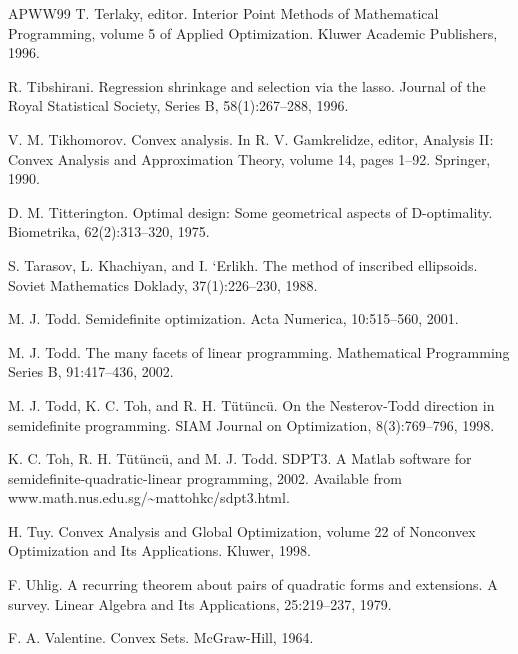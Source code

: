 \begin{thebibliography}{APWW99}
 T. Terlaky, editor. Interior Point Methods of Mathematical Programming, volume 5 of Applied Optimization. Kluwer Academic Publishers, 1996.

 R. Tibshirani. Regression shrinkage and selection via the lasso. Journal of the Royal Statistical Society, Series B, 58(1):267–288, 1996.

 V. M. Tikhomorov. Convex analysis. In R. V. Gamkrelidze, editor, Analysis II: Convex Analysis and Approximation Theory, volume 14, pages 1–92. Springer, 1990.

 D. M. Titterington. Optimal design: Some geometrical aspects of D-optimality. Biometrika, 62(2):313–320, 1975.

 S. Tarasov, L. Khachiyan, and I. `Erlikh. The method of inscribed ellipsoids. Soviet Mathematics Doklady, 37(1):226–230, 1988.

 M. J. Todd. Semidefinite optimization. Acta Numerica, 10:515–560, 2001.

 M. J. Todd. The many facets of linear programming. Mathematical Programming Series B, 91:417–436, 2002.

 M. J. Todd, K. C. Toh, and R. H. Tütüncü. On the Nesterov-Todd direction in semidefinite programming. SIAM Journal on Optimization, 8(3):769–796, 1998.

 K. C. Toh, R. H. Tütüncü, and M. J. Todd. SDPT3. A Matlab software for semidefinite-quadratic-linear programming, 2002. Available from www.math.nus.edu.sg/\textasciitilde{}mattohkc/sdpt3.html.

 H. Tuy. Convex Analysis and Global Optimization, volume 22 of Nonconvex Optimization and Its Applications. Kluwer, 1998.

 F. Uhlig. A recurring theorem about pairs of quadratic forms and extensions. A survey. Linear Algebra and Its Applications, 25:219–237, 1979.

 F. A. Valentine. Convex Sets. McGraw-Hill, 1964.


\end{thebibliography}
